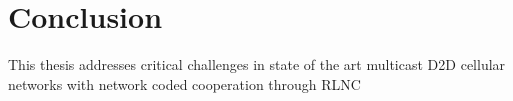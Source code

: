 \section{Conclusion}\label{sec:conclusion}

This thesis addresses critical challenges in state of the art multicast \ac{D2D} cellular networks with network coded cooperation through \ac{RLNC} 

